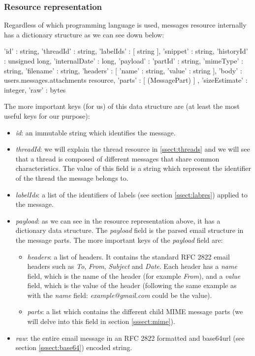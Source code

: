\subsubsection{Resource representation}

Regardless of which programming language is used, messages resource \citep[/v1/reference/users/messages]{gmailAPI} internally has a dictionary structure as we can see down below:

\begin{python}
{
'id' : string,
'threadId' : string,
'labelIds' : [ string ],
'snippet' : string,
'historyId' : unsigned long,
'internalDate' : long,
'payload' : {
	'partId' : string,
	'mimeType' : string,
	'filename' : string,
	'headers' : [
		{
		'name' : string,
		'value' : string
		}
	],
	'body' : users.messages.attachments resource,
	'parts' : [ (MessagePart) ]
	},
'sizeEstimate' : integer,
'raw' : bytes
}
\end{python}

The more important keys (for us) of this data structure are (at least the most useful keys for our purpose):
\begin{itemize}
	\item\textit{id}: an immutable string which identifies the message.
	\item\textit{threadId}: we will explain the thread resource in \ref{ssect:threads} and we will see that a thread is composed of different messages that share common characteristics. The value of this field is a string which represent the identifier of the thread the message belongs to.
	\item\textit{labelIds}: a list of the identifiers of labels (see section \ref{ssect:labres}) applied to the message.
	\item\textit{payload}: as we can see in the resource representation above, it has a dictionary data structure. The \textit{payload} field is the parsed email structure in the message parts. The more important keys of the \textit{payload} field are:
	\begin{itemize}
		\item\textit{headers}: a list of headers. It contains the standard RFC 2822 \citep{rfc2822} email headers such as \textit{To}, \textit{From}, \textit{Subject} and \textit{Date}. Each header has a \textit{name} field, which is the name of the header (for example \textit{From}), and a \textit{value} field, which is the value of the header (following the same example as with the \textit{name} field: \textit{example@gmail.com} could be the value).
		\item\textit{parts}: a list which contains the different child MIME message parts (we will delve into this field in section \ref{sssect:mime}).
	\end{itemize}
	\item\textit{raw}: the entire email message in an RFC 2822 \citep{rfc2822} formatted and base64url (see section \ref{sssect:base64}) encoded string.
\end{itemize}

